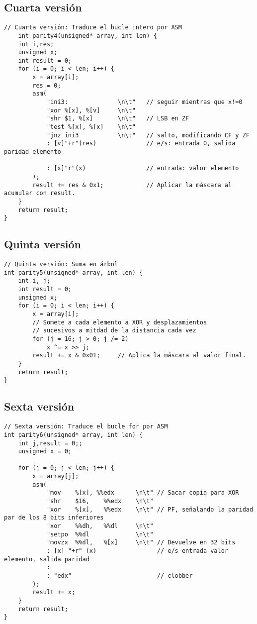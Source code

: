 \subsection{Cuarta versión}
\begin{lstlisting}
// Cuarta versión: Traduce el bucle intero por ASM
	int parity4(unsigned* array, int len) {
	int i,res;
	unsigned x;
	int result = 0;
	for (i = 0; i < len; i++) {
		x = array[i];
		res = 0;
		asm(
			"ini3:				\n\t"   // seguir mientras que x!=0
			"xor %[x], %[v]		\n\t"
			"shr $1, %[x]		\n\t"   // LSB en ZF
			"test %[x], %[x]	\n\t"
			"jnz ini3			\n\t"   // salto, modificando CF y ZF
			: [v]"+r"(res)              // e/s: entrada 0, salida paridad elemento
			
			: [x]"r"(x)                 // entrada: valor elemento
		);
		result += res & 0x1;            // Aplicar la máscara al acumular con result.
	}
	return result;
}
\end{lstlisting}

\subsection{Quinta versión}
\begin{lstlisting}
// Quinta versión: Suma en árbol
int parity5(unsigned* array, int len) {
	int i, j;
	int result = 0;
	unsigned x;
	for (i = 0; i < len; i++) {
		x = array[i];
		// Somete a cada elemento a XOR y desplazamientos
		// sucesivos a mitdad de la distancia cada vez
		for (j = 16; j > 0; j /= 2)
			x ^= x >> j;
		result += x & 0x01;     // Aplica la máscara al valor final.
	}
	return result;
}
\end{lstlisting}

\newpage

\subsection{Sexta versión}
\begin{lstlisting}
// Sexta versión: Traduce el bucle for por ASM
int parity6(unsigned* array, int len) {
	int j,result = 0;;
	unsigned x = 0;
	
	for (j = 0; j < len; j++) {
		x = array[j];
		asm(
			"mov	%[x], %%edx	     \n\t" // Sacar copia para XOR
			"shr	$16,	%%edx	 \n\t"
			"xor	%[x],	%%edx	 \n\t" // PF, señalando la paridad par de los 8 bits inferiores
			"xor	%%dh,	%%dl	 \n\t"
			"setpo  %%dl	         \n\t"
			"movzx	%%dl,	%[x]	 \n\t" // Devuelve en 32 bits
			: [x] "+r" (x)                 // e/s entrada valor elemento, salida paridad
			:
			: "edx"                        // clobber
		);
		result += x;
	}
	return result;
}
\end{lstlisting}

